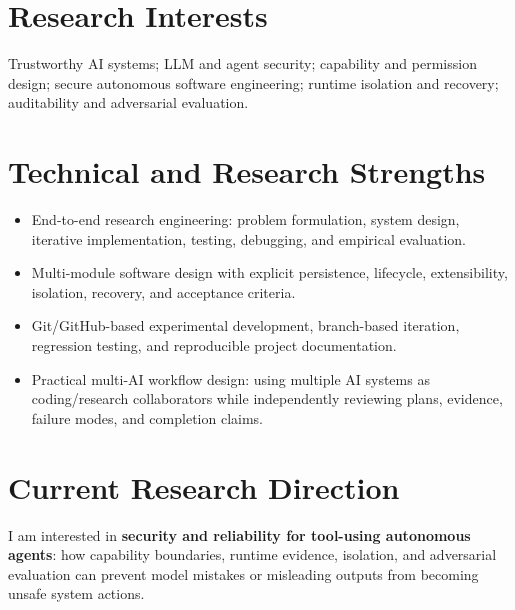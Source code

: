 \documentclass[10pt,a4paper]{article}
\begin{document}
\section{Research Interests}
Trustworthy AI systems; LLM and agent security; capability and permission design; secure autonomous software engineering; runtime isolation and recovery; auditability and adversarial evaluation.

\section{Technical and Research Strengths}
\begin{itemize}
  \item End-to-end research engineering: problem formulation, system design, iterative implementation, testing, debugging, and empirical evaluation.
  \item Multi-module software design with explicit persistence, lifecycle, extensibility, isolation, recovery, and acceptance criteria.
  \item Git/GitHub-based experimental development, branch-based iteration, regression testing, and reproducible project documentation.
  \item Practical multi-AI workflow design: using multiple AI systems as coding/research collaborators while independently reviewing plans, evidence, failure modes, and completion claims.
\end{itemize}

\section{Current Research Direction}
I am interested in \textbf{security and reliability for tool-using autonomous agents}: how capability boundaries, runtime evidence, isolation, and adversarial evaluation can prevent model mistakes or misleading outputs from becoming unsafe system actions.
\end{document}
